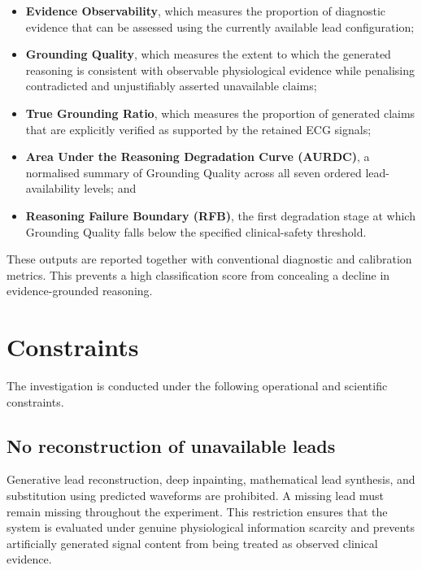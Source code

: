 \documentclass{ssnreview}
\begin{document}
\begin{itemize}
  \item \textbf{Evidence Observability}, which measures the proportion of diagnostic
  evidence that can be assessed using the currently available lead configuration;

  \item \textbf{Grounding Quality}, which measures the extent to which the generated
  reasoning is consistent with observable physiological evidence while penalising
  contradicted and unjustifiably asserted unavailable claims;

  \item \textbf{True Grounding Ratio}, which measures the proportion of generated claims
  that are explicitly verified as supported by the retained ECG signals;

  \item \textbf{Area Under the Reasoning Degradation Curve (AURDC)}, a normalised summary
  of Grounding Quality across all seven ordered lead-availability levels; and

  \item \textbf{Reasoning Failure Boundary (RFB)}, the first degradation stage at which
  Grounding Quality falls below the specified clinical-safety threshold.
\end{itemize}

These outputs are reported together with conventional diagnostic and calibration metrics.
This prevents a high classification score from concealing a decline in evidence-grounded
reasoning.

\section{Constraints}

The investigation is conducted under the following operational and scientific constraints.

\subsection{No reconstruction of unavailable leads}

Generative lead reconstruction, deep inpainting, mathematical lead synthesis, and
substitution using predicted waveforms are prohibited. A missing lead must remain missing
throughout the experiment. This restriction ensures that the system is evaluated under
genuine physiological information scarcity and prevents artificially generated signal
content from being treated as observed clinical evidence.
\end{document}
